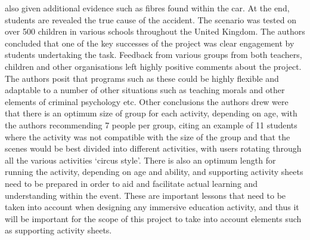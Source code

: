 \documentclass[11pt]{report}
\begin{document}
also given additional evidence such as fibres found within the car. At the end, students are revealed the true cause of the accident. The scenario was tested on over 500 children in various schools throughout the United Kingdom. The authors concluded that one of the key successes of the project was clear engagement by students undertaking the task. Feedback from various groups from both teachers, children and other organisations left highly positive comments about the project. The authors posit that programs such as these could be highly flexible and adaptable to a number of other situations such as teaching morals and other elements of criminal psychology etc. Other conclusions the authors drew were that there is an optimum size of group for each activity, depending on age, with the authors recommending 7 people per group, citing an example of 11 students where the activity was not compatible with the size of the group and that the scenes would be best divided into different activities, with users rotating through all the various activities `circus style'. There is also an optimum length for running the activity, depending on age and ability, and supporting activity sheets need to be prepared in order to aid and facilitate actual learning and understanding within the event. These are important lessons that need to be taken into account when designing any immersive education activity, and thus it will be important for the scope of this project to take into account elements such as supporting activity sheets. 
\end{document}
